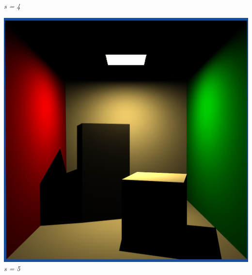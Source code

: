 \documentclass[a4,12pt]{article}
\begin{document}
\begin{center}
\begin{minipage}[b]{0.40\linewidth}
\begin{center}
				\textit{s = 4}
			\end{center}
		\end{minipage}
	\end{center}
	
	\begin{center}
		\begin{minipage}[b]{0.40\linewidth}
			\begin{center}
				\includegraphics[width = \textwidth]{./Worksheet6/cornellblocks5.png}\\
				\textit{s = 5}
			\end{center}
		\end{minipage}
		\hspace{0.05\linewidth}
		\begin{minipage}[b]{0.40\linewidth}
			\begin{center}

\end{center}
\end{minipage}
\end{center}
\end{document}
